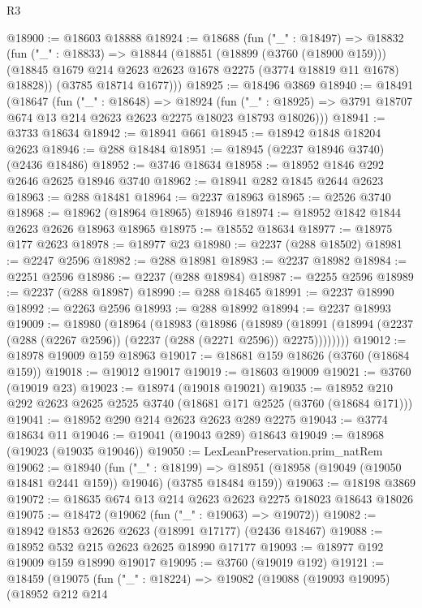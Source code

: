 \begin{lexlean}{R3}
\begin{coremodule}
@18900 := @18603 @18888
@18924 := @18688
    (fun ("_" : @18497) =>
    @18832
      (fun ("_" : @18833) =>
      @18844
        (@18851
          (@18899 (@3760 (@18900 @159)))
          (@18845 @1679 @214 @2623 @2623 @1678 @2275 (@3774 @18819 @11 @1678) @18828))
        (@3785 @18714 @1677)))
@18925 := @18496 @3869
@18940 := @18491
    (@18647
      (fun ("_" : @18648) =>
      @18924
        (fun ("_" : @18925) => @3791 @18707 @674 @13 @214 @2623 @2623 @2275 @18023 @18793 @18026)))
@18941 := @3733 @18634
@18942 := @18941 @661
@18945 := @18942 @1848 @18204 @2623
@18946 := @288 @18484
@18951 := @18945 (@2237 @18946 @3740) (@2436 @18486)
@18952 := @3746 @18634
@18958 := @18952 @1846 @292 @2646 @2625 @18946 @3740
@18962 := @18941 @282 @1845 @2644 @2623
@18963 := @288 @18481
@18964 := @2237 @18963
@18965 := @2526 @3740
@18968 := @18962 (@18964 @18965) @18946
@18974 := @18952 @1842 @1844 @2623 @2626 @18963 @18965
@18975 := @18552 @18634
@18977 := @18975 @177 @2623
@18978 := @18977 @23
@18980 := @2237 (@288 @18502)
@18981 := @2247 @2596
@18982 := @288 @18981
@18983 := @2237 @18982
@18984 := @2251 @2596
@18986 := @2237 (@288 @18984)
@18987 := @2255 @2596
@18989 := @2237 (@288 @18987)
@18990 := @288 @18465
@18991 := @2237 @18990
@18992 := @2263 @2596
@18993 := @288 @18992
@18994 := @2237 @18993
@19009 := @18980
    (@18964
      (@18983
        (@18986
          (@18989
            (@18991 (@18994 (@2237 (@288 (@2267 @2596)) (@2237 (@288 (@2271 @2596)) @2275))))))))
@19012 := @18978 @19009 @159 @18963
@19017 := @18681 @159 @18626 (@3760 (@18684 @159))
@19018 := @19012 @19017
@19019 := @18603 @19009
@19021 := @3760 (@19019 @23)
@19023 := @18974 (@19018 @19021)
@19035 := @18952 @210 @292 @2623 @2625 @2525 @3740 (@18681 @171 @2525 (@3760 (@18684 @171)))
@19041 := @18952 @290 @214 @2623 @2623 @289 @2275
@19043 := @3774 @18634 @11
@19046 := @19041 (@19043 @289) @18643
@19049 := @18968 (@19023 (@19035 @19046))
@19050 := LexLeanPreservation.prim_natRem
@19062 := @18940
    (fun ("_" : @18199) =>
    @18951 (@18958 (@19049 (@19050 @18481 @2441 @159)) @19046) (@3785 @18484 @159))
@19063 := @18198 @3869
@19072 := @18635 @674 @13 @214 @2623 @2623 @2275 @18023 @18643 @18026
@19075 := @18472 (@19062 (fun ("_" : @19063) => @19072))
@19082 := @18942 @1853 @2626 @2623 (@18991 @17177) (@2436 @18467)
@19088 := @18952 @532 @215 @2623 @2625 @18990 @17177
@19093 := @18977 @192 @19009 @159 @18990 @19017
@19095 := @3760 (@19019 @192)
@19121 := @18459
    (@19075
      (fun ("_" : @18224) =>
      @19082
        (@19088
          (@19093 @19095)
          (@18952
            @212
            @214

\end{coremodule}
\end{lexlean}
